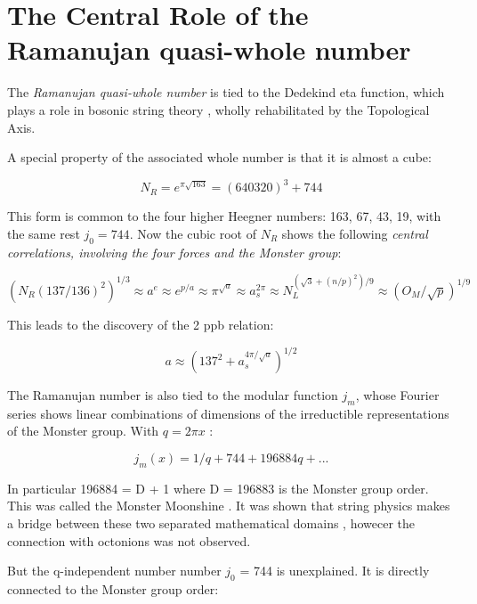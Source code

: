 \documentclass[a4paper,9pt]{article}
\begin{document}
\section{The Central Role of the Ramanujan quasi-whole number}

The \textit{Ramanujan quasi-whole number} is tied to the Dedekind eta function, which plays a role in bosonic string theory \cite{Apostol}\cite{Lovelace}, wholly rehabilitated by the Topological Axis.


A special property of the associated whole number is that it is almost a cube:

\begin{equation}
N_R = e^{\pi \sqrt{163}} = (640320)^3 + 744
\end{equation}

This form is common to the four higher Heegner numbers: 163, 67, 43, 19, with the same rest $j_0 = 744$. Now the cubic root of $N_R$ shows the following \textit {central correlations, involving the four forces and the Monster group}:

\begin{equation}
(N_R (137/136)^2)^{1/3} \approx a^e \approx e^{p/a} \approx \pi^{\sqrt a} \approx a_s^{2\pi} \approx N_L^{(\sqrt3 +(n/p)^2)/9} \approx (O_M/\sqrt p)^{1/9}
\end{equation}

This leads to the discovery of the 2 ppb relation:

\begin{equation}
a \approx (137^2 + a_s^{4\pi/\sqrt a})^{1/2}
\end{equation}

The Ramanujan number is also tied to the modular function $j_m$, whose Fourier series shows linear combinations of dimensions of the irreductible representations of the Monster group. With $q = 2\pi x$ :

\begin{equation}
j_m(x) = 1/q + 744 + 196884 q + ...
\end{equation}

In particular 196884 = D + 1 where D = 196883 is the Monster group order. This was called the Monster Moonshine \cite{Conway}. It was shown that string physics makes a bridge between these two separated mathematical domains \cite{Borcherds}, howecer the connection with octonions was not observed. 


But the q-independent number number $j_0$ = 744 is unexplained. It is directly connected to the Monster group order:
\end{document}
